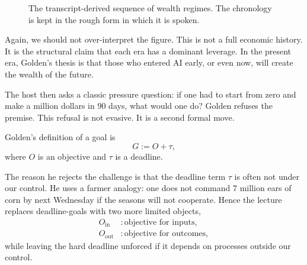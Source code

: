 \begin{figure}[h]
\centering
{}
\caption{The transcript-derived sequence of wealth regimes. The chronology is kept in the rough form in which it is spoken.}
\end{figure}

Again, we should not over-interpret the figure. This is not a full economic history. It is the structural claim that each era has a dominant leverage. In the present era, Golden's thesis is that those who entered AI early, or even now, will create the wealth of the future.

The host then asks a classic pressure question: if one had to start from zero and make a million dollars in \(90\) days, what would one do? Golden refuses the premise. This refusal is not evasive. It is a second formal move.

\begin{definition}
Golden's definition of a goal is
\begin{equation}
G := O + \tau,
\end{equation}
where \(O\) is an objective and \(\tau\) is a deadline.
\end{definition}

The reason he rejects the challenge is that the deadline term \(\tau\) is often not under our control. He uses a farmer analogy: one does not command \(7\) million ears of corn by next Wednesday if the seasons will not cooperate. Hence the lecture replaces deadline-goals with two more limited objects,
\begin{align}
O_{\mathrm{in}} &: \text{objective for inputs},\\
O_{\mathrm{out}} &: \text{objective for outcomes},
\end{align}
while leaving the hard deadline unforced if it depends on processes outside our control.


